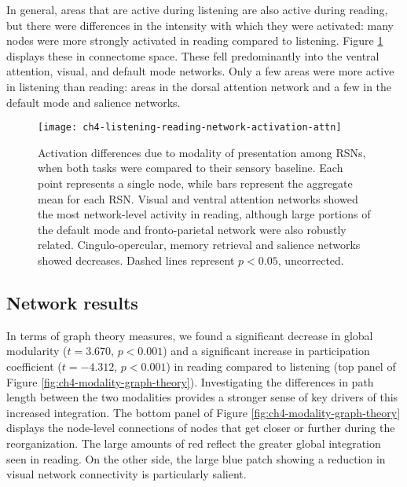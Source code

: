 In general, areas that are active during listening are also active during reading, but there were differences in the intensity with which they were activated: many nodes were more strongly activated in reading compared to listening. Figure \ref{fig:ch4-listening-reading-network-activation-attn} displays these in connectome space. These fell predominantly into the ventral attention, visual, and default mode networks. Only a few areas were more active in listening than reading: areas in the dorsal attention network and a few in the default mode and salience networks. 

\begin{figure}[t]
	\centering
	\texttt{[image: ch4-listening-reading-network-activation-attn]}
    \caption[Activation differences due to modality of presentation among RSNs]{Activation differences due to modality of presentation among RSNs, when both tasks were compared to their sensory baseline. Each point represents a single node, while bars represent the aggregate mean for each RSN. Visual and ventral attention networks showed the most network-level activity in reading, although large portions of the default mode and fronto-parietal network were also robustly related. Cingulo-opercular, memory retrieval and salience networks showed decreases. Dashed lines represent $p < 0.05$, uncorrected.}
	\label{fig:ch4-listening-reading-network-activation-attn}
\end{figure}

\subsection{Network results}

In terms of graph theory measures, we found a significant decrease in global modularity ($t = 3.670$, $p < 0.001$) and a significant increase in participation coefficient ($t = -4.312$, $p < 0.001$) in reading compared to listening (top panel of Figure \ref{fig:ch4-modality-graph-theory}). Investigating the differences in path length between the two modalities provides a stronger sense of key drivers of this increased integration. The bottom panel of Figure \ref{fig:ch4-modality-graph-theory} displays the node-level connections of nodes that get closer or further during the reorganization. The large amounts of red reflect the greater global integration seen in reading. On the other side, the large blue patch showing a reduction in visual network connectivity is particularly salient.

